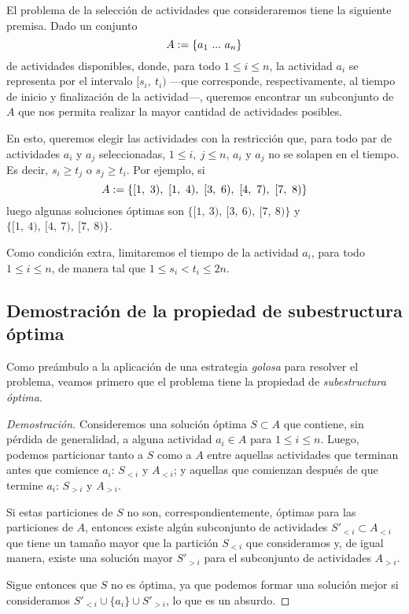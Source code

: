 \vspace{1em}
El problema de la selección de actividades que consideraremos tiene la siguiente premisa. Dado un conjunto 
\begin{equation}\\\nonumber
    A := \{a_1\ ...\ a_n \}
\end{equation}
de actividades disponibles, donde, para todo $1 \leq i \leq n$, la actividad $a_i$ se representa por el intervalo $[s_i,\ t_i)$ ---que corresponde, respectivamente, al tiempo de inicio y finalización de la actividad---,  queremos encontrar un subconjunto de $A$ que nos permita realizar la mayor cantidad de actividades posibles. 

En esto, queremos elegir las actividades con la restricción que, para todo par de actividades $a_i$ y $a_j$ seleccionadas, $1 \leq i,\ j \leq n$, $a_i$ y $a_j$ no se solapen en el tiempo. Es decir, $s_i \geq t_j$ o $s_j \geq t_i$. Por ejemplo, si
\begin{equation}\\\nonumber
    A := \{[1,\ 3),\ [1,\ 4),\ [3,\ 6),\ [4,\ 7),\ [7,\ 8)\}
\end{equation}
\noindent luego algunas soluciones óptimas son $\{[1,\ 3),\ [3,\ 6),\ [7,\ 8)\}$ y $\{[1,\ 4),\ [4,\ 7),\ [7,\ 8)\}$. 

Como condición extra, limitaremos el tiempo de la actividad $a_i$, para todo $1 \leq i \leq n$, de manera tal que $1 \leq s_i < t_i \leq 2n$. 

\subsection{Demostración de la propiedad de subestructura óptima}

Como preámbulo a la aplicación de una estrategia \textit{golosa} para resolver el problema, veamos primero que el problema tiene la propiedad de \textit{subestructura óptima}. 

\begin{proof}[Demostración]
    Consideremos una solución óptima $S \subset A$ que contiene, sin pérdida de generalidad, a alguna actividad $a_i \in A$ para $1 \leq i \leq n$. Luego, podemos particionar tanto a $S$ como a $A$ entre aquellas actividades que terminan antes que comience $a_i$: $S_{<i}$ y $A_{<i}$; y aquellas que comienzan después de que termine $a_i$: $S_{>i}$ y $A_{>i}$. 

    Si estas particiones de $S$ no son, correspondientemente, óptimas para las particiones de $A$, entonces existe algún subconjunto de actividades $S'_{<i} \subset A_{<i}$ que tiene un tamaño mayor que la partición $S_{<i}$ que consideramos y, de igual manera, existe una solución mayor $S'_{>i}$ para el subconjunto de actividades $A_{>i}$.
    
    Sigue entonces que $S$ no es óptima, ya que podemos formar una solución mejor si consideramos $S'_{<i} \cup \{a_i\} \cup S'_{>i}$, lo que es un absurdo.
\end{proof}

